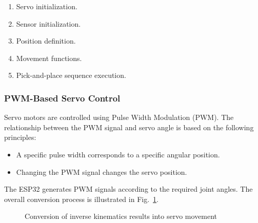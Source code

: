 \begin{enumerate}
    \item Servo initialization.
    \item Sensor initialization.
    \item Position definition.
    \item Movement functions.
    \item Pick-and-place sequence execution.
\end{enumerate}

\subsubsection{PWM-Based Servo Control}

Servo motors are controlled using Pulse Width Modulation (PWM). The relationship between the PWM signal and servo angle is based on the following principles:

\begin{itemize}
    \item A specific pulse width corresponds to a specific angular position.
    \item Changing the PWM signal changes the servo position.
\end{itemize}

The ESP32 generates PWM signals according to the required joint angles. The overall conversion process is illustrated in Fig.~\ref{fig:ik_servo_flow}.

\begin{figure}[htbp]
\centering
{}
\caption{Conversion of inverse kinematics results into servo movement}
\label{fig:ik_servo_flow}
\end{figure}


